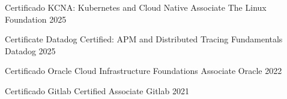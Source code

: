 

\begin{cvhonors}

\cvhonor
  {Certificado} %
  {KCNA: Kubernetes and Cloud Native Associate} %
  {The Linux Foundation} %
  {2025} %


\cvhonor
  {Certificate} %
  {Datadog Certified: APM and Distributed Tracing Fundamentals} %
  {Datadog} %
  {2025} %

  
\cvhonor
  {Certificado} %
  {Oracle Cloud Infrastructure Foundations Associate} %
  {Oracle} %
  {2022} %


  \cvhonor
    {Certificado} %
    {Gitlab Certified Associate} %
    {Gitlab} %
    {2021} %

\end{cvhonors}

